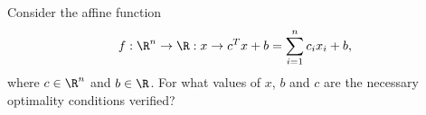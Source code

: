 


Consider the affine function
\[
f: \R^n \to \R : x \to c^T x +b = \sum_{i=1}^n c_i x_i + b,
\]
where $c\in \R^n$ and $b \in \R$.
For what values of $x$, $b$ and $c$ are the necessary optimality conditions
verified?



